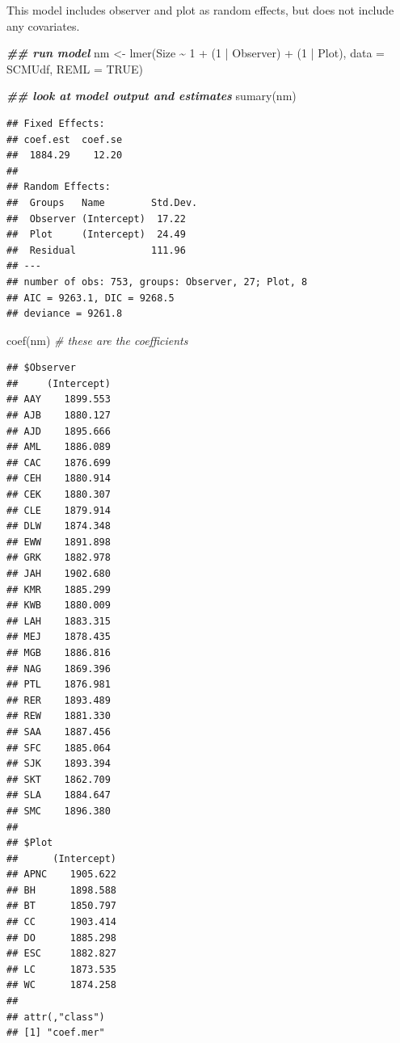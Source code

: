 \documentclass[
]{article}
\newenvironment{Shaded}{\begin{snugshade}}{\end{snugshade}}
\newcommand{\AttributeTok}[1]{\textcolor[rgb]{0.77,0.63,0.00}{#1}}
\newcommand{\CommentTok}[1]{\textcolor[rgb]{0.56,0.35,0.01}{\textit{#1}}}
\newcommand{\ConstantTok}[1]{\textcolor[rgb]{0.00,0.00,0.00}{#1}}
\newcommand{\DecValTok}[1]{\textcolor[rgb]{0.00,0.00,0.81}{#1}}
\newcommand{\DocumentationTok}[1]{\textcolor[rgb]{0.56,0.35,0.01}{\textbf{\textit{#1}}}}
\newcommand{\FunctionTok}[1]{\textcolor[rgb]{0.00,0.00,0.00}{#1}}
\newcommand{\NormalTok}[1]{#1}
\newcommand{\OtherTok}[1]{\textcolor[rgb]{0.56,0.35,0.01}{#1}}
\newcommand{\SpecialCharTok}[1]{\textcolor[rgb]{0.00,0.00,0.00}{#1}}
\begin{document}
This model includes observer and plot as random effects, but does not
include any covariates.

\begin{Shaded}
\begin{Highlighting}[]
\DocumentationTok{\#\# run model}
\NormalTok{nm }\OtherTok{\textless{}{-}} \FunctionTok{lmer}\NormalTok{(Size }\SpecialCharTok{\textasciitilde{}} \DecValTok{1} \SpecialCharTok{+}\NormalTok{ (}\DecValTok{1} \SpecialCharTok{|}\NormalTok{ Observer) }\SpecialCharTok{+}\NormalTok{ (}\DecValTok{1} \SpecialCharTok{|}\NormalTok{ Plot), }\AttributeTok{data =}\NormalTok{ SCMUdf, }\AttributeTok{REML =} \ConstantTok{TRUE}\NormalTok{)}

\DocumentationTok{\#\# look at model output and estimates}
\FunctionTok{sumary}\NormalTok{(nm)}
\end{Highlighting}
\end{Shaded}

\begin{verbatim}
## Fixed Effects:
## coef.est  coef.se 
##  1884.29    12.20 
## 
## Random Effects:
##  Groups   Name        Std.Dev.
##  Observer (Intercept)  17.22  
##  Plot     (Intercept)  24.49  
##  Residual             111.96  
## ---
## number of obs: 753, groups: Observer, 27; Plot, 8
## AIC = 9263.1, DIC = 9268.5
## deviance = 9261.8
\end{verbatim}

\begin{Shaded}
\begin{Highlighting}[]
\FunctionTok{coef}\NormalTok{(nm) }\CommentTok{\# these are the coefficients}
\end{Highlighting}
\end{Shaded}

\begin{verbatim}
## $Observer
##     (Intercept)
## AAY    1899.553
## AJB    1880.127
## AJD    1895.666
## AML    1886.089
## CAC    1876.699
## CEH    1880.914
## CEK    1880.307
## CLE    1879.914
## DLW    1874.348
## EWW    1891.898
## GRK    1882.978
## JAH    1902.680
## KMR    1885.299
## KWB    1880.009
## LAH    1883.315
## MEJ    1878.435
## MGB    1886.816
## NAG    1869.396
## PTL    1876.981
## RER    1893.489
## REW    1881.330
## SAA    1887.456
## SFC    1885.064
## SJK    1893.394
## SKT    1862.709
## SLA    1884.647
## SMC    1896.380
## 
## $Plot
##      (Intercept)
## APNC    1905.622
## BH      1898.588
## BT      1850.797
## CC      1903.414
## DO      1885.298
## ESC     1882.827
## LC      1873.535
## WC      1874.258
## 
## attr(,"class")
## [1] "coef.mer"
\end{verbatim}
\end{document}
